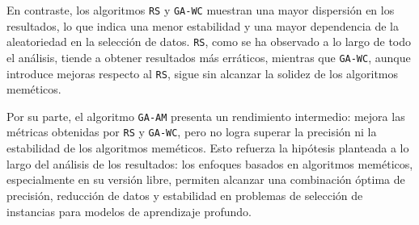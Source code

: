 En contraste, los algoritmos \texttt{RS} y \texttt{GA-WC} muestran una mayor dispersión en los resultados,
lo que indica una menor estabilidad y una mayor dependencia de la aleatoriedad en la selección de datos.
\texttt{RS}, como se ha observado a lo largo de todo el análisis, tiende a obtener resultados más erráticos, mientras que \texttt{GA-WC},
aunque introduce mejoras respecto al \texttt{RS}, sigue sin alcanzar la solidez de los algoritmos meméticos.

Por su parte, el algoritmo \texttt{GA-AM} presenta un rendimiento intermedio: mejora las métricas obtenidas por \texttt{RS} y \texttt{GA-WC},
pero no logra superar la precisión ni la estabilidad de los algoritmos meméticos.
Esto refuerza la hipótesis planteada a lo largo del análisis de los resultados: los enfoques basados en algoritmos meméticos,
especialmente en su versión libre, permiten alcanzar una combinación óptima de precisión,
reducción de datos y estabilidad en problemas de selección de instancias para modelos de aprendizaje profundo.

